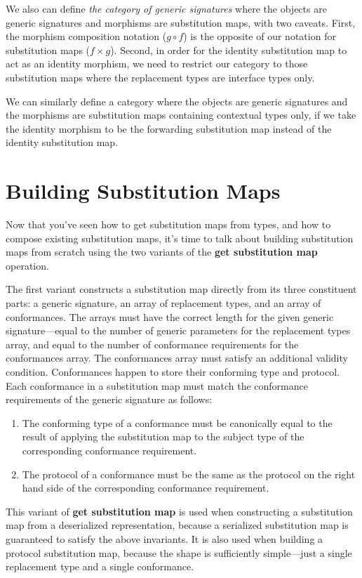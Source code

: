 \documentclass[a4paper,headsepline,bibliography=totoc,toc=flat,fleqn,twoside=semi]{scrbook}
\theoremstyle{definition}
\theoremstyle{definition}
\theoremstyle{definition}
\newcommand{\SubMapC}[2]{\begin{tabular}{|lll|}
\hline
\multicolumn{3}{|l|}{\textbf{Types}}\\
\hline
#1\\
\hline
\hline
\multicolumn{3}{|l|}{\textbf{Conformances}}\\
\hline
#2\\
\hline
\end{tabular}}
\newcommand{\SubType}[2]{\texttt{#1}&$:=$&\texttt{#2}}
\newcommand{\SubConf}[1]{\multicolumn{3}{|l|}{\texttt{#1}}}
\begin{document}
We also can define \emph{the category of generic signatures} where the objects are generic signatures and morphisms are substitution maps, with two caveats. First, the morphism composition notation ($g\circ f$) is the opposite of our notation for substitution maps ($f \times g$). Second, in order for the identity substitution map to act as an identity morphism, we need to restrict our category to those substitution maps where the replacement types are interface types only.

We can similarly define a category where the objects are generic signatures and the morphisms are substitution maps containing contextual types only, if we take the identity morphism to be the forwarding substitution map instead of the identity substitution map.

\section{Building Substitution Maps}\label{buildingsubmaps}

Now that you've seen how to get substitution maps from types, and how to compose existing substitution maps, it's time to talk about building substitution maps from scratch using the two variants of the \textbf{get substitution map} operation.

\newcommand{\InvalidSubjectTypeSubMap}{\SubMapC{
\SubType{T}{Array<Int>}
}{
\SubConf{Array<Int>:\ Sequence}\\
\SubConf{String:\ Comparable}
}}
The first variant constructs a substitution map directly from its three constituent parts: a generic signature, an array of replacement types, and an array of conformances. The arrays must have the correct length for the given generic signature---equal to the number of generic parameters for the replacement types array, and equal to the number of conformance requirements for the conformances array. The conformances array must satisfy an additional validity condition. Conformances happen to store their conforming type and protocol. Each conformance in a substitution map must match the conformance requirements of the generic signature as follows:
\begin{enumerate}
\item The conforming type of a conformance must be canonically equal to the result of applying the substitution map to the subject type of the corresponding conformance requirement.
\item The protocol of a conformance must be the same as the protocol on the right hand side of the corresponding conformance requirement.
\end{enumerate}
This variant of \textbf{get substitution map} is used when constructing a substitution map from a deserialized representation, because a serialized substitution map is guaranteed to satisfy the above invariants. It is also used when building a protocol substitution map, because the shape is sufficiently simple---just a single replacement type and a single conformance.
\end{document}
